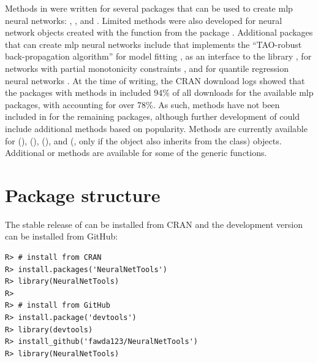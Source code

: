 \documentclass[article,shortnames]{jss}\usepackage[]{graphicx}\usepackage[]{color}
\makeatletter
\newenvironment{kframe}{%
 \def\at@end@of@kframe{}%
 \ifinner\ifhmode%
  \def\at@end@of@kframe{\end{minipage}}%
  \begin{minipage}{\columnwidth}%
 \fi\fi%
 \def\FrameCommand##1{\hskip\@totalleftmargin \hskip-\fboxsep
 \colorbox{shadecolor}{##1}\hskip-\fboxsep
     \hskip-\linewidth \hskip-\@totalleftmargin \hskip\columnwidth}%
 \MakeFramed {\advance\hsize-\width
   \@totalleftmargin\z@ \linewidth\hsize
   \@setminipage}}%
 {\par\unskip\endMakeFramed%
 \at@end@of@kframe}
\newenvironment{knitrout}{}{} %
\makeatother
\begin{document}
Methods in  were written for several  packages that can be used to create \ac{mlp} neural networks:  \citep{Fritsch12},  \citep{Venables02}, and  \citep{Bergmeir12}. Limited methods were also developed for neural network objects created with the  function from the  package \citep{Kuhn15}.  Additional  packages that can create \ac{mlp} neural networks include  that implements the ``TAO-robust back-propagation algorithm'' for model fitting \citep{Castejon14},  as an  interface to the   library \citep{Klima15},  for networks with partial monotonicity constraints \citep{Cannon15}, and  for quantile regression neural networks \citep{Cannon11}.  At the time of writing, the \ac{CRAN} download logs \citep{Csardi15} showed that the  packages with methods in  included 94\% of all downloads for the available \ac{mlp} packages, with  accounting for over 78\%.  As such, methods have not been included in  for the remaining packages, although further development of  could include additional methods based on popularity.  Methods are currently available for   (),  (),  (), and  (, only if the object also inherits from the  class) objects.  Additional  or  methods are available for some of the generic functions.

\section[Package structure]{Package structure}

The stable release of  can be installed from \ac{CRAN} and the development version can be installed from GitHub:

\begin{knitrout}
\color{fgcolor}\begin{kframe}
\begin{verbatim}
R> # install from CRAN
R> install.packages('NeuralNetTools')
R> library(NeuralNetTools)
R> 
R> # install from GitHub
R> install.package('devtools')
R> library(devtools)
R> install_github('fawda123/NeuralNetTools')
R> library(NeuralNetTools)
\end{verbatim}
\end{kframe}
\end{knitrout}
\end{document}
